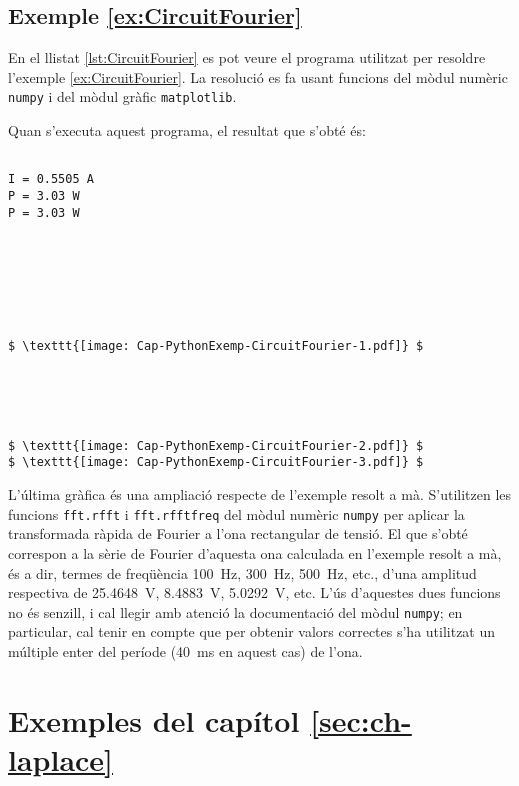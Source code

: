 \hypertarget{exemple:CircuitFourier}{\subsection{Exemple \ref*{ex:CircuitFourier} \CircuitFourier}}
En el llistat \vref{lst:CircuitFourier} es pot veure el programa utilitzat per resoldre l'exemple \vref{ex:CircuitFourier}. La resolució es fa usant funcions del mòdul numèric \texttt{numpy} i del mòdul gràfic  \texttt{matplotlib}.


Quan s'executa aquest programa, el resultat que s'obté és:
\lstset{
	language=,
	numbers=none,
	frame=none
}
\begin{lstlisting}[mathescape=true]
	
I = 0.5505 A
P = 3.03 W
P = 3.03 W







$ \texttt{[image: Cap-PythonExemp-CircuitFourier-1.pdf]} $





$ \texttt{[image: Cap-PythonExemp-CircuitFourier-2.pdf]} $
$ \texttt{[image: Cap-PythonExemp-CircuitFourier-3.pdf]} $
\end{lstlisting} 

L'última gràfica és una ampliació respecte de l'exemple resolt a mà. S'utilitzen les funcions \texttt{fft.rfft} i \texttt{fft.rfftfreq} del mòdul numèric \texttt{numpy} per aplicar la transformada ràpida de Fourier a l'ona rectangular de tensió. El que s'obté correspon a la sèrie de Fourier d'aquesta ona calculada en l'exemple resolt a  mà, és a dir, termes de freqüència \qty{100}{Hz}, \qty{300}{Hz}, \qty{500}{Hz}, etc., d'una amplitud respectiva de \qty{25,4648}{V}, \qty{8,4883}{V}, \qty{5,0292}{V}, etc. L'ús d'aquestes dues funcions no és senzill, i cal llegir amb atenció la documentació del mòdul \texttt{numpy}; en particular, cal tenir en compte que per obtenir valors correctes s'ha utilitzat un múltiple enter del període (\qty{40}{ms} en aquest cas) de l'ona.


\section{Exemples del capítol \ref*{sec:ch-laplace}}

